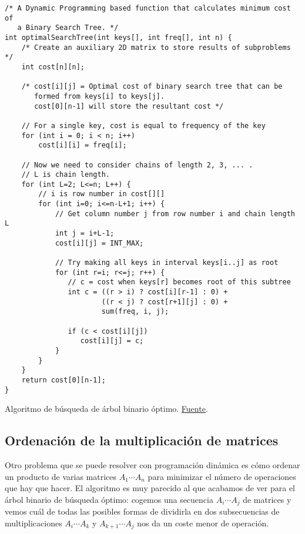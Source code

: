 \documentclass[palatino, nochap]{apuntes}
\begin{document}
\begin{listing}[hbtp]
\begin{verbatim}
/* A Dynamic Programming based function that calculates minimum cost of
   a Binary Search Tree. */
int optimalSearchTree(int keys[], int freq[], int n) {
    /* Create an auxiliary 2D matrix to store results of subproblems */
    int cost[n][n];

    /* cost[i][j] = Optimal cost of binary search tree that can be
       formed from keys[i] to keys[j].
       cost[0][n-1] will store the resultant cost */

    // For a single key, cost is equal to frequency of the key
    for (int i = 0; i < n; i++)
        cost[i][i] = freq[i];

    // Now we need to consider chains of length 2, 3, ... .
    // L is chain length.
    for (int L=2; L<=n; L++) {
        // i is row number in cost[][]
        for (int i=0; i<=n-L+1; i++) {
            // Get column number j from row number i and chain length L
            int j = i+L-1;
            cost[i][j] = INT_MAX;

            // Try making all keys in interval keys[i..j] as root
            for (int r=i; r<=j; r++) {
               // c = cost when keys[r] becomes root of this subtree
               int c = ((r > i) ? cost[i][r-1] : 0) +
                       ((r < j) ? cost[r+1][j] : 0) +
                       sum(freq, i, j);

               if (c < cost[i][j])
                  cost[i][j] = c;
            }
        }
    }
    return cost[0][n-1];
}
\end{verbatim}
\caption{Algoritmo de búsqueda de árbol binario óptimo. \href{http://www.geeksforgeeks.org/dynamic-programming-set-24-optimal-binary-search-tree/}{Fuente}. }
\label{lst:ArbolBinario}
\end{listing}


\subsection{Ordenación de la multiplicación de matrices}

Otro problema que se puede resolver con programación dinámica es cómo ordenar un producto de varias matrices $A_1 \dotsb A_n$ para minimizar el número de operaciones que hay que hacer. El algoritmo es muy parecido al que acabamos de ver para el árbol binario de búsqueda óptimo: cogemos una secuencia $A_i \dotsb A_j$ de matrices y vemos cuál de todas las posibles formas de dividirla en dos subsecuencias de multiplicaciones $A_i \dotsb A_k$ y $A_{k + 1} \dotsb A_j$ nos da un coste menor de operación.
\end{document}
